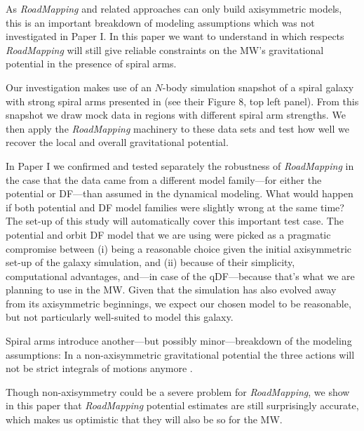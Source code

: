 \documentclass[iop,revtex4,numberedappendix,appendixfloats]{emulateapj}
\newcommand{\RM}{{\sl RoadMapping}}
\begin{document}
As \RM{} and related approaches can only build axisymmetric models, this is an important breakdown of modeling assumptions which was not investigated in Paper I. In this paper we want to understand in which respects \RM{} will still give reliable constraints on the MW's gravitational potential in the presence of spiral arms.

Our investigation makes use of an $N$-body simulation snapshot of a spiral galaxy with strong spiral arms presented in \citet{2013ApJ...766...34D} (see their Figure 8, top left panel). From this snapshot we draw mock data in regions with different spiral arm strengths. We then apply the \RM{} machinery to these data sets and test how well we recover the local and overall gravitational potential.

In Paper I we confirmed and tested separately the robustness of \RM{} in the case that the data came from a different model family---for either the potential or DF---than assumed in the dynamical modeling. What would happen if both potential and DF model families were slightly wrong at the same time? The set-up of this study will automatically cover this important test case. The potential and orbit DF model that we are using were picked as a pragmatic compromise between (i) being a reasonable choice given the initial axisymmetric set-up of the galaxy simulation, and (ii) because of their simplicity, computational advantages, and---in case of the qDF---because that's what we are planning to use in the MW. Given that the simulation has also evolved away from its axisymmetric beginnings, we expect our chosen model to be reasonable, but not particularly well-suited to model this galaxy.

Spiral arms introduce another---but possibly minor---breakdown of the modeling assumptions: In a non-axisymmetric gravitational potential the three actions will not be strict integrals of motions anymore \citep{2008gady.book.....B,2011A&A...527A.147M,2012A&A...548A.127M,2012MNRAS.422.1363S,2012MNRAS.421.1529G,2016ApJ...824...39V}.

Though non-axisymmetry could be a severe problem for \RM{}, we show in this paper that \RM{} potential estimates are still surprisingly accurate, which makes us optimistic that they will also be so for the MW. 
\end{document}

